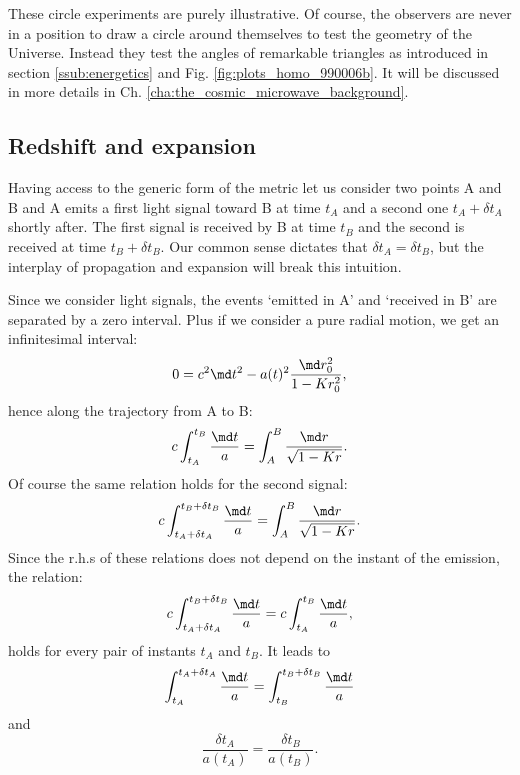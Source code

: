 These circle experiments are purely illustrative. Of course, the observers are never in a position to draw a circle around themselves to test the geometry of the Universe. Instead they test the angles of remarkable triangles as introduced in section \ref{ssub:energetics} and Fig. \ref{fig:plots_homo_990006b}. It will be discussed in more details in Ch. \ref{cha:the_cosmic_microwave_background}.
\subsection{Redshift and expansion} %
\label{sub:redshift_and_expansion}
Having access to the generic form of the metric let us consider two points A and B and A emits a first light signal toward B at time $t_A$ and a second one $t_A+\delta t_A$ shortly after. The first signal is received by B at time $t_B$ and the second is received at time $t_B+\delta t_B$. Our common sense dictates that $\delta t_A=\delta t_B$, but the interplay of propagation and expansion will break this intuition.

Since we consider light signals, the events `emitted in A' and `received in B' are separated by a zero interval. Plus if we consider a pure radial motion, we get an infinitesimal interval:
\begin{equation}
	0=c^2\md t^2-a(t)^2\frac{\md r_0^2}{1-Kr_0^2},
\end{equation}
hence along the trajectory from A to B:
\begin{equation}
	c\int_{t_A}^{t_B}\frac{\md t}{a}=\int_A^B\frac{\md r}{\sqrt{1-Kr}}.
\end{equation}
Of course the same relation holds for the second signal:
\begin{equation}
	c\int_{t_A+\delta t_A}^{t_B+\delta t_B}\frac{\md t}{a}=\int_A^B\frac{\md r}{\sqrt{1-Kr}}.
\end{equation}
Since the r.h.s of these relations does not depend on the instant of the emission, the relation:
\begin{equation}
	c\int_{t_A+\delta t_A}^{t_B+\delta t_B}\frac{\md t}{a}=c\int_{t_A}^{t_B}\frac{\md t}{a},
\end{equation}
holds for every pair of instants $t_A$ and $t_B$. It leads to 
\begin{equation}
	\int_{t_A}^{t_A+\delta t_A}\frac{\md t}{a}=\int_{t_B}^{t_B+\delta t_B}\frac{\md t}{a}
	\end{equation}
and
\begin{equation}
	\frac{\delta t_A}{a(t_A)}=\frac{\delta t_B}{a(t_B)}.
	\label{eq:dilatation}
\end{equation}

